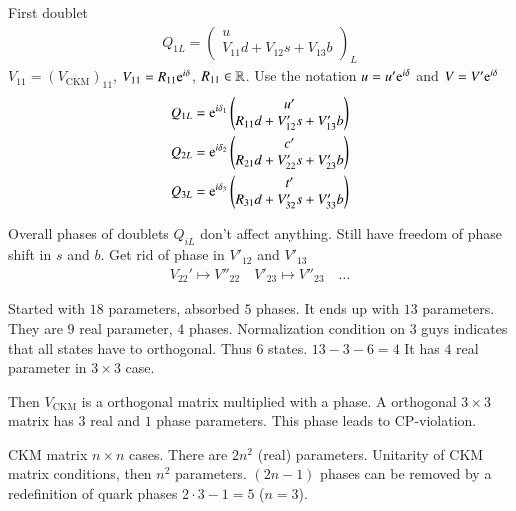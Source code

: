 First doublet
\begin{align}
   Q_{1L} = \begin{pmatrix}  u \\ V_{11}d + V_{12} s + V_{13} b \end{pmatrix}_L
\end{align}
$V_{11} = (V_\text{CKM})_{11}$, $V_{11} = R_{11} \mathrm{e}^{i\delta}$, $R_{11} \in \mathbb{R}$. Use the notation $u = u' \mathrm{e}^{i\delta}$ and $V = V' \mathrm{e}^{i\delta}$
\begin{align*}
   Q_{1L} &= \mathrm{e}^{i\delta_1} \begin{pmatrix} u' \\ R_{11}d + V'_{12} s + V'_{13} b \end{pmatrix} \\
   Q_{2L} &= \mathrm{e}^{i\delta_2} \begin{pmatrix} c' \\ R_{21}d + V'_{22} s + V'_{23} b \end{pmatrix} \\
   Q_{3L} &= \mathrm{e}^{i\delta_3} \begin{pmatrix} t' \\ R_{31}d + V'_{32} s + V'_{33} b \end{pmatrix}
\end{align*}

Overall phases of doublets $Q_{iL}$ don't affect anything. Still have freedom of phase shift in $s$ and $b$. Get rid of phase in $V'_{12}$ and $V'_{13}$
\begin{align*}
   V_{22}' \mapsto V''_{22} \quad V'_{23} \mapsto V''_{23}  \quad \dots
\end{align*}

Started with $18$ parameters, absorbed $5$ phases. It ends up with $13$ parameters. They are $9$ real parameter, $4$ phases. Normalization condition on $3$ guys indicates that all states have to orthogonal. Thus $6$ states. $13 - 3 - 6 = 4$ It has $4$ real parameter in $3 \times 3$ case.

Then $V_\text{CKM}$ is a orthogonal matrix multiplied with a phase. A orthogonal $3 \times 3$ matrix has $3$ real and $1$ phase parameters. This phase leads to CP-violation.

CKM matrix $n \times n$ cases. There are $2n^2$ (real) parameters. Unitarity of CKM matrix conditions, then $n^2$ parameters. $(2n-1)$ phases can be removed by a redefinition of quark phases $2 \cdot 3 - 1 = 5$ ($n=3$). 

